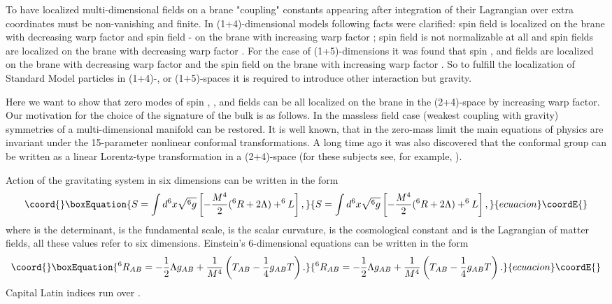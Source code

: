 \documentclass[a4paper,a4paper]{article}
\begin{document}
To have localized multi-dimensional fields on a brane "coupling"
constants appearing after integration of their Lagrangian over
extra coordinates must be non-vanishing and finite. In
(1+4)-dimensional models following facts were clarified: spin \coordHE{}
field is localized on the brane with decreasing warp factor and
spin \coordHE{} field - on the brane with increasing warp factor
\cite{BaGa}; spin \coordHE{} field is not normalizable at all \cite{Po}
and spin \coordHE{} fields are localized on the brane with decreasing
warp factor \cite{RaSu,G1}. For the case of (1+5)-dimensions it
was found that spin \coordHE{}, \coordHE{} and \coordHE{} fields are localized on the
brane with decreasing warp factor and the spin \coordHE{} field on the
brane with increasing warp factor \cite{Od}. So to fulfill the
localization of Standard Model particles in (1+4)-, or
(1+5)-spaces it is required to introduce other interaction but
gravity.

Here we want to show that zero modes of spin \coordHE{}, \coordHE{}, \coordHE{} and \coordHE{} 
fields can be all localized on the brane in the (2+4)-space by 
increasing warp factor. Our motivation for the choice of the 
signature of the bulk is as follows. In the massless field case 
(weakest coupling with gravity) symmetries of a multi-dimensional 
manifold can be restored. It is well known, that in the zero-mass 
limit the main equations of physics are invariant under the 
15-parameter nonlinear conformal transformations. A long time ago it 
was also discovered that the conformal group can be written as a 
linear Lorentz-type transformation in a (2+4)-space (for these 
subjects see, for example, \cite{PeRi}).

Action of the gravitating system in six dimensions can be written
in the form
\begin{equation}\coord{}\boxEquation{ \label{action}
S = \int d^6x\sqrt{^6g}\left[- \frac{M^4}{2}(^6R + 2 \Lambda) +
^6L \right] ,
}{ S = \int d^6x\sqrt{^6g}\left[- \frac{M^4}{2}(^6R + 2 \Lambda) +
^6L \right] ,
}{ecuacion}\coordE{}\end{equation}
where \coordHE{} is the determinant, \coordHE{} is the fundamental scale,
\coordHE{} is the scalar curvature, \myHighlight{$\Lambda$}\coordHE{} is the cosmological
constant and \coordHE{} is the Lagrangian of matter fields, all these
values refer to six dimensions. Einstein's 6-dimensional equations
can be written in the form
\begin{equation}\coord{}\boxEquation{ \label{Einstein6}
^6R_{AB} = -\frac {1}{2}\Lambda g_{AB} + \frac {1}{M^4}\left(
T_{AB}- \frac {1}{4} g_{AB}T\right).
}{ ^6R_{AB} = -\frac {1}{2}\Lambda g_{AB} + \frac {1}{M^4}\left(
T_{AB}- \frac {1}{4} g_{AB}T\right).
}{ecuacion}\coordE{}\end{equation}
Capital Latin indices run over \coordHE{}.
\end{document}
